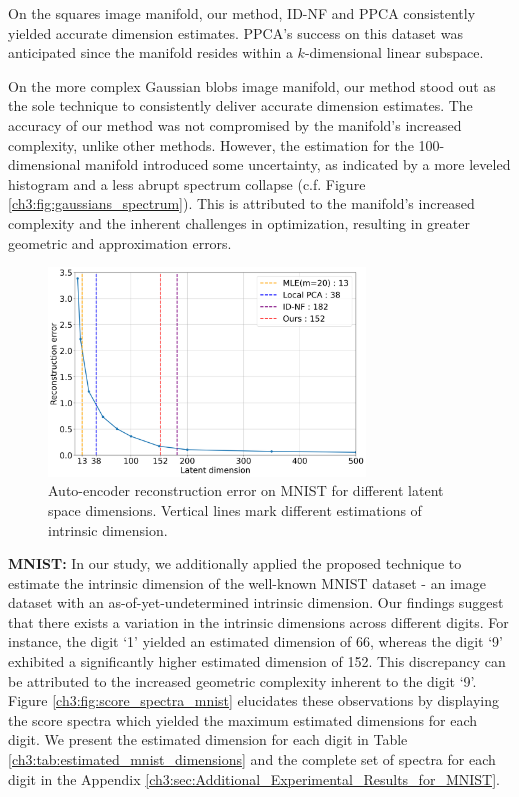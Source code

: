 On the squares image manifold, our method, ID-NF and PPCA consistently yielded accurate dimension estimates. PPCA's success on this dataset was anticipated since the manifold resides within a $k$-dimensional linear subspace.

On the more complex Gaussian blobs image manifold, our method stood out as the sole technique to consistently deliver accurate dimension estimates.  The accuracy of our method was not compromised by the manifold's increased complexity, unlike other methods. However, the estimation for the 100-dimensional manifold introduced some uncertainty, as indicated by a more leveled histogram and a less abrupt spectrum collapse (c.f. Figure \ref{ch3:fig:gaussians_spectrum}). This is attributed to the manifold's increased complexity and the inherent challenges in optimization, resulting in greater geometric and approximation errors.

\begin{figure}
    \begin{center}
        \includegraphics[width=0.75\textwidth]{Chapter3/figures/mnist_autoencoder.png}
        \caption{Auto-encoder reconstruction error on MNIST for different latent space dimensions. Vertical lines mark different estimations of intrinsic dimension.}
        \label{ch3:fig:mnist_autoencoder}
    \end{center}
\end{figure}


\textbf{MNIST:} In our study, we additionally applied the proposed technique to estimate the intrinsic dimension of the well-known MNIST dataset - an image dataset with an as-of-yet-undetermined intrinsic dimension. Our findings suggest that there exists a variation in the intrinsic dimensions across different digits. For instance, the digit `1' yielded an estimated dimension of 66, whereas the digit `9' exhibited a significantly higher estimated dimension of 152. This discrepancy can be attributed to the increased geometric complexity inherent to the digit `9'. Figure \ref{ch3:fig:score_spectra_mnist} elucidates these observations by displaying the score spectra which yielded the maximum estimated dimensions for each digit. We present the estimated dimension for each digit in Table \ref{ch3:tab:estimated_mnist_dimensions} and the complete set of spectra for each digit in the Appendix \ref{ch3:sec:Additional_Experimental_Results_for_MNIST}. 

